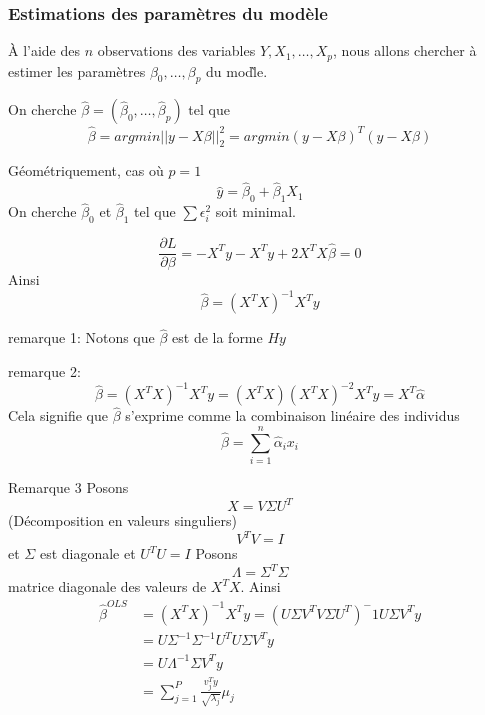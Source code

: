 \documentclass{article}
\begin{document}
\subsubsection{Estimations des param\`etres du mod\`ele}
\`A l'aide des $n$ observations des variables $Y,X_1,\ldots,X_p$, nous allons chercher \`a estimer les param\`etres $\beta_0,\ldots,\beta_p$ du mod\`le.

On cherche $\hat{\beta}=(\hat{\beta}_0,\ldots,\hat{\beta}_p)$ tel que 
\begin{equation}
\hat{\beta}=argmin ||y-X\beta||_2^2=argmin (y-X\beta)^T(y-X\beta)
\end{equation}

G\'eom\'etriquement, cas o\`u $p=1$
\begin{equation}
\hat{y}=\hat{\beta}_0+\hat{\beta}_1 X_1
\end{equation}
On cherche $\hat{\beta}_0$ et $\hat{\beta}_1$ tel que $\sum \epsilon_i^2$ soit minimal.

\begin{equation}
\frac{\partial L}{\partial \beta}=-X^Ty-X^Ty+2X^TX\hat{\beta}=0
\end{equation}
Ainsi
\begin{equation}
\hat{\beta}=(X^TX)^{-1}X^Ty
\end{equation}

remarque 1: Notons que $\hat{\beta}$ est de la forme $Hy$

remarque 2:
\begin{equation}
\hat{\beta}=(X^TX)^{-1}X^Ty=(X^TX)(X^TX)^{-2}X^Ty=X^T\hat{\alpha}
\end{equation}
Cela signifie que $\hat{\beta}$ s'exprime comme la combinaison lin\'eaire des individus
\begin{equation}
\hat{\beta}=\sum_{i=1}^n \hat{\alpha}_ix_i
\end{equation}

Remarque 3
Posons 
\begin{equation}
X=V\Sigma U^T
\end{equation}
(D\'ecomposition en valeurs singuliers)
\begin{equation}
V^TV=I
\end{equation}
et $\Sigma$ est diagonale et $U^TU=I$
Posons 
\begin{equation}
\Lambda=\Sigma^T\Sigma
\end{equation}
matrice diagonale des valeurs de $X^TX$. Ainsi
\begin{equation}
\begin{split}
\hat{\beta}^{OLS}&=(X^TX)^{-1}X^Ty=(U\Sigma V^TV\Sigma U^T)^-1U\Sigma V^T y\\
&=U\Sigma^{-1}\Sigma^{-1}U^TU\Sigma V^Ty\\
&=U\Lambda^{-1}\Sigma V^Ty\\
&=\sum_{j=1}^{P}\frac{v_j^Ty}{\sqrt{\lambda_j}}\mu_j
\end{split}
\end{equation}
\end{document}
